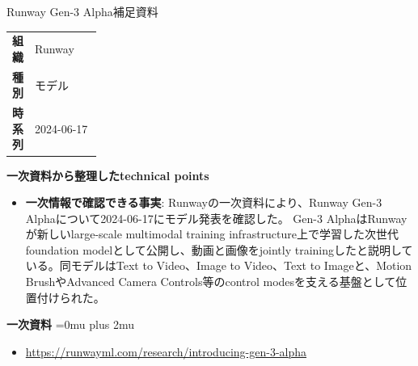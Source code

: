 \Needspace{0.38\textheight}
\begin{technicalnote}{Runway Gen-3 Alpha}{補足資料}
\begingroup
\begin{tabularx}{\linewidth}{@{}>{\bfseries}p{0.22\linewidth}X@{}}
組織 & Runway \\
種別 & モデル \\
時系列 & 2024-06-17 \\
\end{tabularx}
\smallskip
\begin{minipage}{\linewidth}
{\bfseries 一次資料から整理したtechnical points}
\begin{itemize}[leftmargin=1.5em,itemsep=0.35em]
\item \textbf{一次情報で確認できる事実}: Runwayの一次資料により、Runway Gen-3 Alphaについて2024-06-17にモデル発表を確認した。 Gen-3 AlphaはRunwayが新しいlarge-scale multimodal training infrastructure上で学習した次世代foundation modelとして公開し、動画と画像をjointly trainingしたと説明している。同モデルはText to Video、Image to Video、Text to Imageと、Motion BrushやAdvanced Camera Controls等のcontrol modesを支える基盤として位置付けられた。
\end{itemize}
\begin{minipage}{\linewidth}
\begin{samepage}
{\bfseries 一次資料}
\begingroup\sloppy
\Urlmuskip=0mu plus 2mu\relax
\begin{itemize}[leftmargin=1.5em,itemsep=0.25em]
\item {\scriptsize\url{https://runwayml.com/research/introducing-gen-3-alpha}}
\end{itemize}
\endgroup
\end{samepage}
\end{minipage}
\end{minipage}
\endgroup
\end{technicalnote}
\medskip

